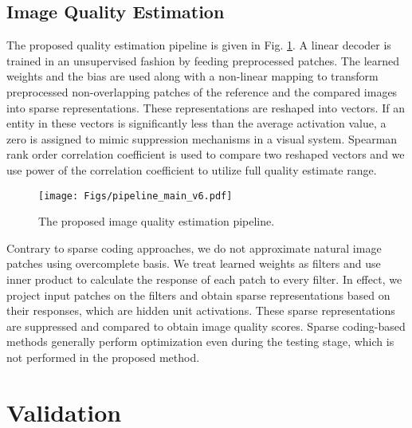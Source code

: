 \documentclass[draftcls,12pt, onecolumn]{IEEEtran}
\begin{document}
\subsection{Image Quality Estimation}
\vspace{-0.5mm}
The proposed quality estimation pipeline is given in Fig. \ref{fig:main}.
A linear decoder is trained in an unsupervised fashion by feeding preprocessed patches. The learned weights and the bias are used along with a non-linear mapping to transform preprocessed non-overlapping patches of the reference and the compared images into sparse representations. These representations are reshaped into vectors. If an entity in these vectors is significantly less than the average activation value, a zero is assigned to mimic suppression mechanisms in a visual system. Spearman rank order correlation coefficient is used to compare two reshaped vectors and we use  power of the correlation coefficient to utilize full quality estimate range.
	\vspace{-1.0mm}

\begin{figure}[htbp!]
	\begin{center}
		\noindent
		\texttt{[image: Figs/pipeline\_main\_v6.pdf]}
		\caption{The proposed image quality estimation pipeline.}
		\label{fig:main}
	\end{center}
	\vspace{-6.0mm}
\end{figure}

Contrary to sparse coding approaches, we do not approximate natural image patches using overcomplete basis. We treat learned weights as filters and use inner product to calculate the response of each patch to every filter. In effect, we project input patches on the filters and obtain sparse representations based on their responses, which are hidden unit activations. These sparse representations are suppressed and compared to obtain image quality scores. Sparse coding-based methods generally perform optimization even during the testing stage, which is not performed in the proposed method. 



 \section{Validation}
\vspace{-3.0mm}
\end{document}
